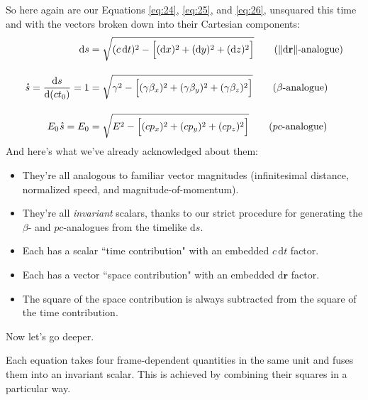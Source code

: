\documentclass[12pt]{article}
\renewcommand{\vv}[1]{\mathbf{#1}}
\newcommand{\dd}[1]{\mathrm{d}#1}
\begin{document}
So here again are our Equations \ref{eq:24}, \ref{eq:25}, and \ref{eq:26}, unsquared this time and with the vectors broken down into their Cartesian components:
\begin{align*}
\dd s&=\sqrt{(c \, \dd t)^2 - \Bigl[ (\dd x)^2 + (\dd y)^2 + (\dd z)^2 \Bigr]} \tag{$\Vert \dd \vv r \Vert$-analogue} \\[10pt]
\mathring{s} = \dfrac{\dd s}{\dd (c t_0)} =1&=\sqrt{\gamma^2 - \Bigl[ (\gamma \beta_x)^2 + (\gamma \beta_y)^2 + (\gamma \beta_z)^2 \Bigr]} \tag{$\beta$-analogue} \\[10pt]
E_0 \mkern1mu \mathring{s} = E_0 &=\sqrt{E^2 - \Bigl[ (cp_x)^2 + (cp_y)^2 + (cp_z)^2 \Bigr] } \tag{$p c$-analogue}
\end{align*}
And here's what we've already acknowledged about them:
\begin{itemize}
\item They're all analogous to familiar vector magnitudes (infinitesimal distance, normalized speed, and magnitude-of-momentum).
\item They're all \emph{invariant} scalars, thanks to our strict procedure for generating the $\beta$- and $p c$-analogues from the timelike $\dd s$.
\item Each has a scalar ``time contribution" with an embedded $c\, \dd t$ factor.
\item Each has a vector ``space contribution" with an embedded $\dd \vv r$ factor.
\item The square of the space contribution is always subtracted from the square of the time contribution.
\end{itemize}
Now let's go deeper.

Each equation takes four frame-dependent quantities in the same unit and fuses them into an invariant scalar. This is achieved by combining their squares in a particular way.
\end{document}
